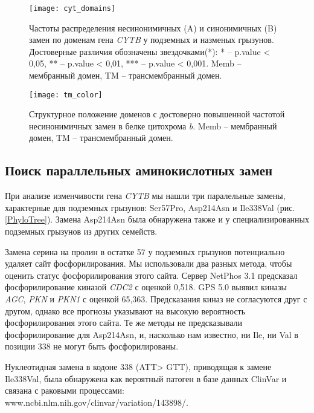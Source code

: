 \begin{figure}[h!]
	\begin{center}
		\texttt{[image: cyt\_domains]}
	\end{center}
	\caption{Частоты распределения несинонимичных (A) и синонимичных (B) замен по доменам гена \textit{CYTB} у подземных и назменых грызунов. Достоверные различия обозначены звездочками(*): * -- p.value < 0,05, ** -- p.value < 0,01, *** -- p.value < 0,001. Memb -- мембранный домен, TM -- трансмембранный домен. }\label{Cyt_Dom_fig}
\end{figure}


\begin{figure}[h!]
	\begin{center}
		\texttt{[image: tm\_color]}
	\end{center}
	\caption{Структурное положение доменов с достоверно повышенной частотой несинонимичных замен в белке цитохрома \textit{b}. Memb -- мембранный домен, TM -- трансмембранный домен. }\label{Cyt_Dom_str}
\end{figure}


\subsection{Поиск параллельных аминокислотных замен}

При анализе изменчивости гена \textit{CYTB} мы нашли три паралельные замены, характерные для подземных грызунов: Ser57Pro, Asp214Asn и Ile338Val (рис. \ref{PhyloTree}). Замена Asp214Asn была обнаружена также и у специализированных подземных грызунов из других семейств.

Замена серина на пролин в остатке 57 у подземных грызунов потенциально удаляет сайт фосфорилирования. Мы использовали два разных метода, чтобы оценить статус фосфорилирования этого сайта. Сервер NetPhos 3.1 предсказал фосфорилирование киназой \textit{CDC2} с оценкой 0,518. GPS 5.0 выявил киназы \textit{AGC}, \textit{PKN} и \textit{PKN1} с оценкой 65,363. Предсказания киназ не согласуются друг с другом, однако все прогнозы указывают на высокую вероятность фосфорилирования этого сайта. Те же методы не предсказывали фосфорилирование для Asp214Asn, и, насколько нам известно, ни Ile, ни Val в позиции 338 не могут быть фосфорилированы.

Нуклеотидная замена в кодоне 338 (ATT> GTT), приводящая к замене Ile338Val, была обнаружена как вероятный патоген в базе данных ClinVar и связана с раковыми процессами: www.ncbi.nlm.nih.gov/clinvar/variation/143898/.

